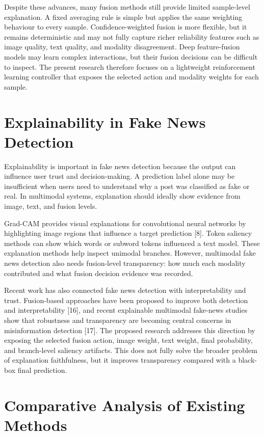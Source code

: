 Despite these advances, many fusion methods still provide limited sample-level explanation. A fixed averaging rule is simple but applies the same weighting behaviour to every sample. Confidence-weighted fusion is more flexible, but it remains deterministic and may not fully capture richer reliability features such as image quality, text quality, and modality disagreement. Deep feature-fusion models may learn complex interactions, but their fusion decisions can be difficult to inspect. The present research therefore focuses on a lightweight reinforcement learning controller that exposes the selected action and modality weights for each sample.


\section{Explainability in Fake News Detection}


Explainability is important in fake news detection because the output can influence user trust and decision-making. A prediction label alone may be insufficient when users need to understand why a post was classified as fake or real. In multimodal systems, explanation should ideally show evidence from image, text, and fusion levels.


Grad-CAM provides visual explanations for convolutional neural networks by highlighting image regions that influence a target prediction [8]. Token saliency methods can show which words or subword tokens influenced a text model. These explanation methods help inspect unimodal branches. However, multimodal fake news detection also needs fusion-level transparency: how much each modality contributed and what fusion decision evidence was recorded.


Recent work has also connected fake news detection with interpretability and trust. Fusion-based approaches have been proposed to improve both detection and interpretability [16], and recent explainable multimodal fake-news studies show that robustness and transparency are becoming central concerns in misinformation detection [17]. The proposed research addresses this direction by exposing the selected fusion action, image weight, text weight, final probability, and branch-level saliency artifacts. This does not fully solve the broader problem of explanation faithfulness, but it improves transparency compared with a black-box final prediction.


\section{Comparative Analysis of Existing Methods}


